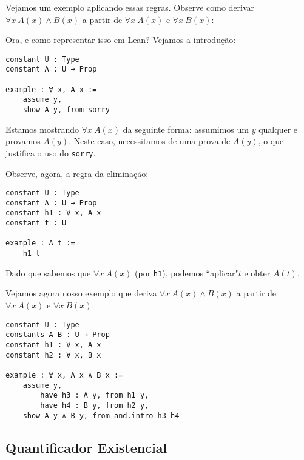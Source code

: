         Vejamos um exemplo aplicando essas regras. Observe como derivar $\forall x \ A(x) \land B(x)$ a partir de $\forall x \ A(x)$ e $\forall x \ B(x)$:

        \begin{center}
            \begin{bprooftree}
            \end{bprooftree}
        \end{center}

        Ora, e como representar isso em Lean? Vejamos a introdução:

        \begin{lstlisting}
constant U : Type
constant A : U → Prop

example : ∀ x, A x :=
    assume y,
    show A y, from sorry
\end{lstlisting}

        Estamos mostrando $\forall x \ A(x)$ da seguinte forma: assumimos um $y$ qualquer e provamos $A(y)$.
Neste caso, necessitamos de uma prova de $A(y)$, o que justifica o uso do \lstinline{sorry}.

        Observe, agora, a regra da eliminação:

        \begin{lstlisting}
constant U : Type
constant A : U → Prop
constant h1 : ∀ x, A x
constant t : U

example : A t :=
    h1 t
\end{lstlisting}

        Dado que sabemos que $\forall x \ A(x)$ (por \lstinline{h1}), podemos ``aplicar"\space $t$ e obter $A(t)$.

        Vejamos agora nosso exemplo que deriva $\forall x \ A(x) \land B(x)$ a partir de $\forall x \ A(x)$ e $\forall x \ B(x)$:

        \begin{lstlisting}
constant U : Type
constants A B : U → Prop
constant h1 : ∀ x, A x
constant h2 : ∀ x, B x

example : ∀ x, A x ∧ B x :=
    assume y,
        have h3 : A y, from h1 y,
        have h4 : B y, from h2 y,
    show A y ∧ B y, from and.intro h3 h4
\end{lstlisting}

    \subsection{Quantificador Existencial}